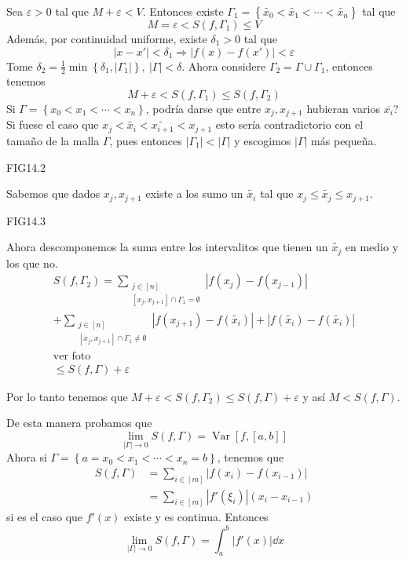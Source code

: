 \documentclass[12pt]{article}
\theoremstyle{plain}
\theoremstyle{definition}
\theoremstyle{remark}
\numberwithin{equation}{section}
\DeclareMathOperator{\Var}{Var}     %
\renewcommand{\leq}{\leqslant}      %
\renewcommand{\:}{\colon}           %
\newcommand{\conj}[1]{\left\lbrace#1\right\rbrace}
\newcommand{\bonj}[1]{\left\lbrack#1\right\rbrack}
\begin{document}
\begin{multicols}{2}
\begin{ptcbp}
Sea $\varepsilon>0$ tal que $M+\varepsilon<V$. Entonces existe $\Gamma_1=\conj{\tilde{x_0}<\tilde{x_1}<\cdots<\tilde{x_n}}$ tal que
$$M=\varepsilon< S(f,\Gamma_1)\leq V$$
Además, por continuidad uniforme, existe $\delta_1>0$ tal que
$$|x-x'|<\delta_1\Rightarrow|f(x)-f(x')|<\varepsilon$$
Tome $\delta_2=\frac{1}{2}\min\conj{\delta_1,|\Gamma_1|},\ |\Gamma|<\delta$. Ahora considere $\Gamma_2=\Gamma\cup\Gamma_1$, entonces tenemos
$$M+\varepsilon<S(f,\Gamma_1)\leq S(f,\Gamma_2)$$
Si $\Gamma=\conj{x_0<x_1<\cdots<x_n}$, podría darse que entre $x_j, x_{j+1}$ hubieran varios $\overline{x_i}$? Si fuese el caso que $x_j<\tilde{x_i}<\tilde{x_{i+1}}<x_{j+1}$ esto sería contradictorio con el tamaño de la malla $\Gamma$, pues entonces $|\Gamma_1|<|\Gamma|$ y escogimos $|\Gamma|$ más pequeña.\par
FIG14.2\par
Sabemos que dados $x_j,x_{j+1}$ existe a los sumo un $\tilde{x_i}$ tal que $x_j\leq\tilde{x_j}\leq x_{j+1}$. \par
FIG14.3\par
Ahora descomponemos la suma entre los intervalitos que tienen un $\tilde{x_j}$ en medio y los que no.
\begin{gather*}
  S(f,\Gamma_2)=\sum_{\substack{j\in\bonj{n}\\ \bonj{x_j,x_{j+1}}\cap\Gamma_1=\emptyset}}|f(x_j)-f(x_{j-1})|\\
  +\sum_{\substack{j\in\bonj{n}\\ \bonj{x_j,x_{j+1}}\cap\Gamma_1\neq\emptyset}}|f(x_{j+1})-f(\tilde{x_{i}})|+|f(\tilde{x_{i}})-f(\tilde{x_{i}})| \\
  \text{ver foto} \\
  \leq S(f,\Gamma)+\varepsilon
\end{gather*}

Por lo tanto tenemos que $M+\varepsilon<S(f,\Gamma_2)\leq S(f,\Gamma)+\varepsilon$ y así $M< S(f,\Gamma)$.

\end{ptcbp}

De esta manera probamos que
$$\lim_{|\Gamma|\to 0}S(f,\Gamma)=\Var\bonj{f,\bonj{a,b}}$$
Ahora si $\Gamma=\conj{a=x_0<x_1<\cdots<x_n=b}$, tenemos que
\begin{align*}
  S(f,\Gamma) & =\sum_{i\in\bonj{m}}|f(x_i)-f(x_{i-1})|\\
  &=\sum_{i\in\bonj{m}}|f'(\xi_i)|(x_i-x_{i-1})
\end{align*}
si es el caso que $f'(x)$ existe y es continua. Entonces
$$\lim_{|\Gamma|\to 0}S(f,\Gamma)=\int_{a}^{b}|f'(x)|\dd x$$


\end{multicols}
\end{document}
